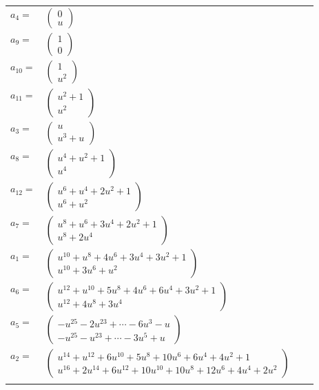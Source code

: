 \documentclass[1p]{elsarticle_modified}
\theoremstyle{definition}
\begin{document}
\begin{tabular}{m{7pt} m{180pt} m{7pt} m{180pt} }
\flushright $a_{4}=$&$\begin{pmatrix}0\\u\end{pmatrix}$ \\
\flushright $a_{9}=$&$\begin{pmatrix}1\\0\end{pmatrix}$ \\
\flushright $a_{10}=$&$\begin{pmatrix}1\\u^2\end{pmatrix}$ \\
\flushright $a_{11}=$&$\begin{pmatrix}u^2+1\\u^2\end{pmatrix}$ \\
\flushright $a_{3}=$&$\begin{pmatrix}u\\u^3+u\end{pmatrix}$ \\
\flushright $a_{8}=$&$\begin{pmatrix}u^4+u^2+1\\u^4\end{pmatrix}$ \\
\flushright $a_{12}=$&$\begin{pmatrix}u^6+u^4+2 u^2+1\\u^6+u^2\end{pmatrix}$ \\
\flushright $a_{7}=$&$\begin{pmatrix}u^8+u^6+3 u^4+2 u^2+1\\u^8+2 u^4\end{pmatrix}$ \\
\flushright $a_{1}=$&$\begin{pmatrix}u^{10}+u^8+4 u^6+3 u^4+3 u^2+1\\u^{10}+3 u^6+u^2\end{pmatrix}$ \\
\flushright $a_{6}=$&$\begin{pmatrix}u^{12}+u^{10}+5 u^8+4 u^6+6 u^4+3 u^2+1\\u^{12}+4 u^8+3 u^4\end{pmatrix}$ \\
\flushright $a_{5}=$&$\begin{pmatrix}- u^{25}-2 u^{23}+\cdots-6 u^3- u\\- u^{25}- u^{23}+\cdots-3 u^5+u\end{pmatrix}$ \\
\flushright $a_{2}=$&$\begin{pmatrix}u^{14}+u^{12}+6 u^{10}+5 u^8+10 u^6+6 u^4+4 u^2+1\\u^{16}+2 u^{14}+6 u^{12}+10 u^{10}+10 u^8+12 u^6+4 u^4+2 u^2\end{pmatrix}$\\&\end{tabular}
\end{document}
